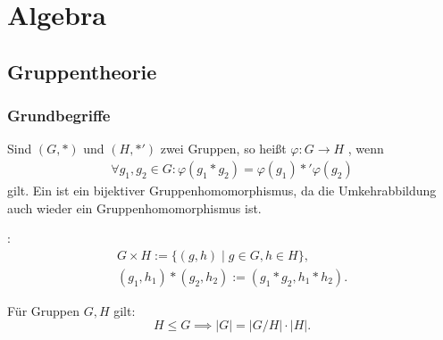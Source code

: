 
\chapter{Algebra}
\section{Gruppentheorie}
\subsection{Grundbegriffe}
\begin{definition}[Gruppenhomomorphismus]\mbox{}\newline
Sind $(G,*)$ und $(H,*')$ zwei Gruppen, so
heißt $\varphi\colon G\to H$ %
, wenn
\begin{gather}
\forall g_1,g_2\in G\colon
  \varphi(g_1*g_2) = \varphi(g_1)*'\varphi(g_2)
\end{gather}
gilt. Ein 
ist ein bijektiver Gruppenhomomorphismus, da die Umkehrabbildung
auch wieder ein Gruppenhomomorphismus ist.
\end{definition}
\begin{definition}\mbox{}\newline
{}:
\begin{gather}
G\times H := \{(g,h)\mid g\in G, h\in H\},\\
(g_1,h_1)*(g_2,h_2) := (g_1*g_2, h_1*h_2).
\end{gather}
\end{definition}
\noindent
{} Für Gruppen $G,H$ gilt:
\begin{equation}
H\le G\implies |G| = |G/H|\cdot |H|.
\end{equation}


